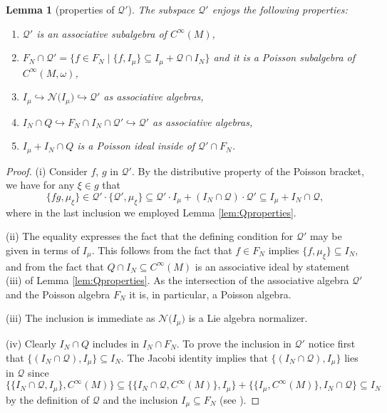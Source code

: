 \documentclass[10pt,a4paper]{amsart}
\numberwithin{equation}{section}
\newtheorem{Lemma}[Theorem]{Lemma}
\renewcommand{\subset}{\subseteq}
\begin{document}
\begin{Lemma}[properties of $\mathcal{Q}'$]\label{lem:Qprimeproperties}
	The subspace $\mathcal{Q}'$ enjoys the following properties:
	\begin{enumerate}\itemsep=0pt
		\item[$(i)$] $\mathcal{Q}'$ is an associative subalgebra of $C^\infty(M)$,
		\item[$(ii)$] $F_N\cap\mathcal{Q}'=\{f\in F_N \mid  \{f,I_\mu\}\subset I_\mu + \mathcal{Q}\cap I_N \}$ and it is a Poisson subalgebra of $C^\infty(M,\omega)$,
		\item[$(iii)$] $I_\mu\hookrightarrow \mathcal{N}\bigl(I_\mu\bigr)\hookrightarrow \mathcal{Q}'$ as associative algebras,
		\item[$(iv)$] $I_N\cap Q \hookrightarrow F_N\cap I_N \cap \mathcal{Q}' \hookrightarrow \mathcal{Q}'$ as associative algebras,
		\item[$(v)$] $I_\mu+I_N\cap Q$ is a Poisson ideal inside of $\mathcal{Q}'\cap F_N$.
	\end{enumerate}
\end{Lemma}
\begin{proof}
		(i)
		Consider $f$, $g$ in $\mathcal{Q}'$. By the distributive property of the Poisson bracket, we have for any $\xi \in g$ that
		\[
			\{f g, \mu_\xi\} \in \mathcal{Q}'\cdot\bigl\{\mathcal{Q}',\mu_\xi\bigr\}
			\subset
			\mathcal{Q}'\cdot I_\mu + (I_N\cap \mathcal{Q})\cdot \mathcal{Q}'
			\subset
			I_\mu+ I_N \cap \mathcal{Q},
		\]
		where in the last inclusion we employed Lemma \ref{lem:Qproperties}.

		(ii)
		The equality expresses the fact that the defining condition for $\mathcal{Q}'$ may be given in terms of $I_\mu$.
		This follows from the fact that $f \in F_N$ implies $\{f,\mu_\xi\}\subset I_N$, and from the fact that $Q\cap I_N\subset C^\infty(M)$ is an associative ideal by statement (iii) of Lemma \ref{lem:Qproperties}.
		As the intersection of the associative algebra $\mathcal{Q}'$ and the Poisson algebra $F_N$ it is, in particular, a Poisson algebra.

		(iii)
			The inclusion is immediate as $\mathcal{N}\bigl(I_\mu\bigr)$ is a Lie algebra normalizer.
		
        (iv)
			Clearly $I_N\cap Q$ includes in $I_N\cap F_N$.
			To prove the inclusion in $\mathcal{Q}'$ notice first that $\{(I_N\cap \mathcal{Q}),I_\mu\}\subset I_N$.
			The Jacobi identity implies that $\{(I_N\cap \mathcal{Q}),I_\mu\}$ lies in $\mathcal{Q}$ since
			\[
				 \{\{I_N\cap\mathcal{Q},I_\mu\},C^\infty(M) \}
				\subset
				 \{\{I_N\cap\mathcal{Q},C^\infty(M)\},I_\mu \}
				+
				 \{\{I_\mu,C^\infty(M)\},I_N\cap\mathcal{Q}  \}
				\subset
				I_N
			\]
	by the definition of $\mathcal{Q}$ and the inclusion $I_\mu\subset F_N$ (see \cite[Proposition~5.1]{ArmsGotayJennings90}).
\end{proof}
\end{document}

